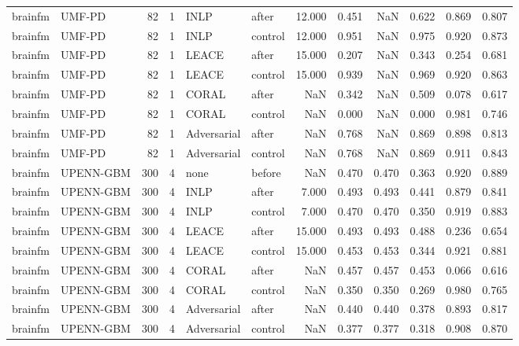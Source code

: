 \begin{tabular}{llrrllrrrrrr}
brainfm & UMF-PD & 82 & 1 & INLP & after & 12.000 & 0.451 & NaN & 0.622 & 0.869 & 0.807 \\
brainfm & UMF-PD & 82 & 1 & INLP & control & 12.000 & 0.951 & NaN & 0.975 & 0.920 & 0.873 \\
brainfm & UMF-PD & 82 & 1 & LEACE & after & 15.000 & 0.207 & NaN & 0.343 & 0.254 & 0.681 \\
brainfm & UMF-PD & 82 & 1 & LEACE & control & 15.000 & 0.939 & NaN & 0.969 & 0.920 & 0.863 \\
brainfm & UMF-PD & 82 & 1 & CORAL & after & NaN & 0.342 & NaN & 0.509 & 0.078 & 0.617 \\
brainfm & UMF-PD & 82 & 1 & CORAL & control & NaN & 0.000 & NaN & 0.000 & 0.981 & 0.746 \\
brainfm & UMF-PD & 82 & 1 & Adversarial & after & NaN & 0.768 & NaN & 0.869 & 0.898 & 0.813 \\
brainfm & UMF-PD & 82 & 1 & Adversarial & control & NaN & 0.768 & NaN & 0.869 & 0.911 & 0.843 \\
brainfm & UPENN-GBM & 300 & 4 & none & before & NaN & 0.470 & 0.470 & 0.363 & 0.920 & 0.889 \\
brainfm & UPENN-GBM & 300 & 4 & INLP & after & 7.000 & 0.493 & 0.493 & 0.441 & 0.879 & 0.841 \\
brainfm & UPENN-GBM & 300 & 4 & INLP & control & 7.000 & 0.470 & 0.470 & 0.350 & 0.919 & 0.883 \\
brainfm & UPENN-GBM & 300 & 4 & LEACE & after & 15.000 & 0.493 & 0.493 & 0.488 & 0.236 & 0.654 \\
brainfm & UPENN-GBM & 300 & 4 & LEACE & control & 15.000 & 0.453 & 0.453 & 0.344 & 0.921 & 0.881 \\
brainfm & UPENN-GBM & 300 & 4 & CORAL & after & NaN & 0.457 & 0.457 & 0.453 & 0.066 & 0.616 \\
brainfm & UPENN-GBM & 300 & 4 & CORAL & control & NaN & 0.350 & 0.350 & 0.269 & 0.980 & 0.765 \\
brainfm & UPENN-GBM & 300 & 4 & Adversarial & after & NaN & 0.440 & 0.440 & 0.378 & 0.893 & 0.817 \\
brainfm & UPENN-GBM & 300 & 4 & Adversarial & control & NaN & 0.377 & 0.377 & 0.318 & 0.908 & 0.870 \\
\bottomrule
\end{tabular}
